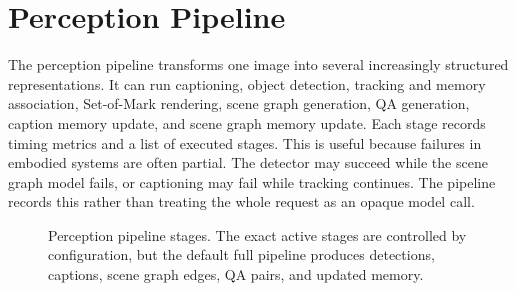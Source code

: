 \section{Perception Pipeline}\label{sec:server-perception-pipeline}

The perception pipeline transforms one image into several increasingly structured representations. It can run captioning, object detection, tracking and memory association, Set-of-Mark rendering, scene graph generation, QA generation, caption memory update, and scene graph memory update. Each stage records timing metrics and a list of executed stages. This is useful because failures in embodied systems are often partial. The detector may succeed while the scene graph model fails, or captioning may fail while tracking continues. The pipeline records this rather than treating the whole request as an opaque model call.

\begin{figure}[t]
\centering
{}
\caption{Perception pipeline stages. The exact active stages are controlled by configuration, but the default full pipeline produces detections, captions, scene graph edges, QA pairs, and updated memory.}
\label{fig:server-perception-pipeline}
\end{figure}

